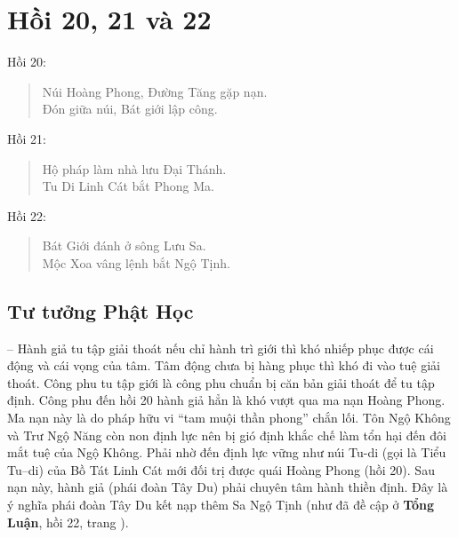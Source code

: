 \chapter{Hồi 20, 21 và 22} %
\label{cha:hoi_20_21_22}

Hồi 20:

\begin{verse}
\begin{itshape}
Núi Hoàng Phong, Đường Tăng gặp nạn.\\
Đón giữa núi, Bát giới lập công.
\end{itshape}
\end{verse}

Hồi 21:

\begin{verse}
\begin{itshape}
Hộ pháp làm nhà lưu Đại Thánh.\\
Tu Di Linh Cát bắt Phong Ma.
\end{itshape}
\end{verse}

Hồi 22:

\begin{verse}
\begin{itshape}
Bát Giới đánh ở sông Lưu Sa.\\
Mộc Xoa vâng lệnh bắt Ngộ Tịnh.
\end{itshape}
\end{verse}

\section{Tư tưởng Phật Học} %
\label{sec:20_21_22_phat_hoc}

-- Hành giả tu tập giải thoát nếu chỉ hành trì giới thì khó nhiếp phục được cái động và cái vọng của tâm. Tâm động chưa bị hàng phục thì khó đi vào tuệ giải thoát. Công phu tu tập giới là công phu chuẩn bị căn bản giải thoát để tu tập định. Công phu đến hồi 20 hành giả hẳn là khó vượt qua ma nạn Hoàng Phong. Ma nạn này là do pháp hữu vi ``tam muội thần phong'' chắn lối. Tôn Ngộ Không và Trư Ngộ Năng còn non định lực nên bị gió định khắc chế làm tổn hại đến đôi mắt tuệ của Ngộ Không. Phải nhờ đến định lực vững như núi Tu-di (gọi là Tiểu Tu--di) của Bồ Tát Linh Cát mới đối trị được quái Hoàng Phong (hồi 20). Sau nạn này, hành giả (phái đoàn Tây Du) phải chuyên tâm hành thiền định. Đây là ý nghĩa phái đoàn Tây Du kết nạp thêm Sa Ngộ Tịnh (như đã đề cập ở {\bf Tổng Luận}, hồi 22, trang \pageref{sub:ve_sa_ngo_tinh}).

